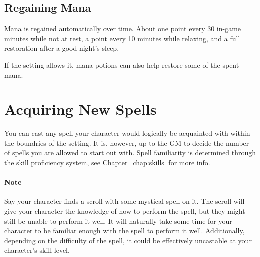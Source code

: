 \subsection{Regaining Mana}
Mana is regained automatically over time.
About one point every 30 in-game minutes while not at rest,
a point every 10 minutes while relaxing,
and a full restoration after a good night's sleep.

If the setting allows it, mana potions can also help restore some of the spent mana.

\section{Acquiring New Spells}
You can cast any spell your character would logically be acquainted with within the boundries of the setting.
It is, however, up to the GM to decide the number of spells you are allowed to start out with.
Spell familiarity is determined through the skill proficiency system, see Chapter~\ref{chap:skills} for more info.

\paragraph{Note} Say your character finds a scroll with some mystical spell on it.
The scroll will give your character the knowledge of how to perform the spell, but they might still be unable to perform it well.
It will naturally take some time for your character to be familiar enough with the spell to perform it well.
Additionally, depending on the difficulty of the spell, it could be effectively uncastable at your character's skill level.
